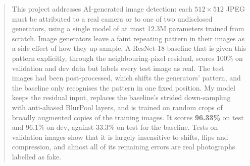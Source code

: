 \begin{abstract}
This project addresses AI-generated image detection: each $512\times512$ JPEG must be attributed to a real camera or to one of two undisclosed generators, using a single model of at most 12.3M parameters trained from scratch. Image generators leave a faint repeating pattern in their images as a side effect of how they up-sample. A ResNet-18 baseline that is given this pattern explicitly, through the neighbouring-pixel residual, scores 100\% on validation and dev data but labels every test image as real. The test images had been post-processed, which shifts the generators' pattern, and the baseline only recognises the pattern in one fixed position. My model keeps the residual input, replaces the baseline's strided down-sampling with anti-aliased BlurPool layers, and is trained on random crops of broadly augmented copies of the training images. It scores \textbf{96.33\%} on test and 96.1\% on dev, against 33.3\% on test for the baseline. Tests on validation images show that it is largely insensitive to shifts, flips and compression, and almost all of its remaining errors are real photographs labelled as fake.
\end{abstract}
